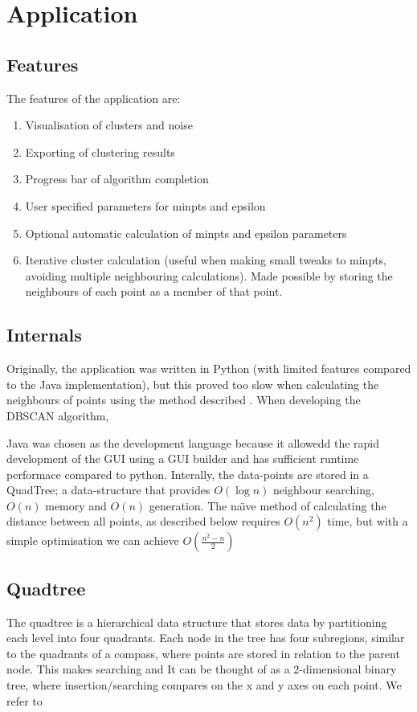 \documentclass{CRPITStyle}
\begin{document}
\section{Application}
\subsection{Features}
The features of the application are:
\begin{enumerate}
\item Visualisation of clusters and noise
\item Exporting of clustering results
\item Progress bar of algorithm completion
\item User specified parameters for minpts and epsilon
\item Optional automatic calculation of minpts and epsilon parameters 
\item Iterative cluster calculation (useful when making small tweaks to minpts, avoiding multiple neighbouring calculations). Made possible by storing the neighbours of each point as a member of that point.
\end{enumerate}

\subsection{Internals}
Originally, the application was written in Python (with limited features compared to the Java implementation), but this proved too slow when calculating the neighbours of points using the method described . When developing the DBSCAN algorithm, 

Java was chosen as the development language because it allowedd the rapid development of the GUI using a GUI builder and has sufficient runtime performace compared to python. Interally, the data-points are stored in a QuadTree; a data-structure that provides $O(\log n)$ neighbour searching, $O(n)$ memory and $O(n)$ generation. The na\"{\i}ve method of calculating the distance between all points, as described below requires $O(n^2)$ time, but with a simple optimisation we can achieve $O(\frac{n^2 -n}{2})$

\subsection{Quadtree}
The quadtree \citet{Samet:1984:QRH:356924.356930} is a hierarchical data structure that stores data by partitioning each level into four quadrants. Each node in the tree has four subregions, similar to the quadrants of a compass, where points are stored in relation to the parent node. This makes searching and  It can be thought of as a 2-dimensional binary tree, where insertion/searching compares on the x and y axes on each point. We refer to
\end{document}
